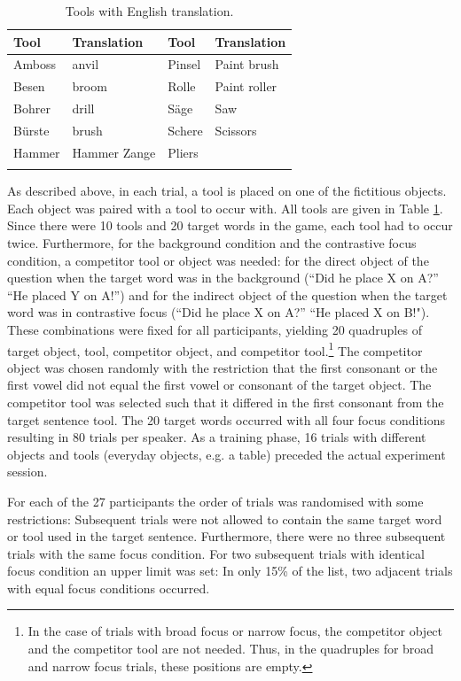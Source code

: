 \begin{table}[t]
	\caption{Tools with English translation.}
	\begin{tabularx}{\textwidth}{XlXl}
		\lsptoprule
		\textbf{Tool} & \textbf{Translation} & \textbf{Tool} & \textbf{Translation} \\
		\hline
		Amboss & anvil & Pinsel & Paint brush \\
		Besen & broom & Rolle & Paint roller \\ 
		Bohrer & drill & Säge & Saw \\
		Bürste & brush & Schere & Scissors \\
		Hammer & Hammer Zange & Pliers\\
		\lspbottomrule
	\end{tabularx}
	\label{tab:tools}
\end{table}

As described above, in each trial, a tool is placed on one of the fictitious objects. Each object was paired with a tool to occur with. All tools are given in Table \ref{tab:tools}. Since there were 10 tools and 20 target words in the game, each tool had to occur twice. Furthermore, for the background condition and the contrastive focus condition, a competitor tool or object was needed: for the direct object of the question when the target word was in the background (``Did he place X on A?” “He placed Y on A!”) and for the indirect object of the question when the target word was in contrastive focus (``Did he place X on A?” “He placed X on B!"). These combinations were fixed for all participants, yielding 20 quadruples of target object, tool, competitor object, and competitor tool.\footnote{In the case of trials with broad focus or narrow focus, the competitor object and the competitor tool are not needed. Thus, in the quadruples for broad and narrow focus trials, these positions are empty.} The competitor object was chosen randomly with the restriction that the first consonant or the first vowel did not equal the first vowel or consonant of the target object. The competitor tool was selected such that it differed in the first consonant from the target sentence tool. The 20 target words occurred with all four focus conditions resulting in 80 trials per speaker. As a training phase, 16 trials with different objects and tools (everyday objects, e.g. a table) preceded the actual experiment session. 



For each of the 27 participants the order of trials was randomised with some restrictions: Subsequent trials were not allowed to contain the same target word or tool used in the target sentence. Furthermore, there were no three subsequent trials with the same focus condition. For two subsequent trials with identical focus condition an upper limit was set: In only 15\% of the list, two adjacent trials with equal focus conditions occurred.

